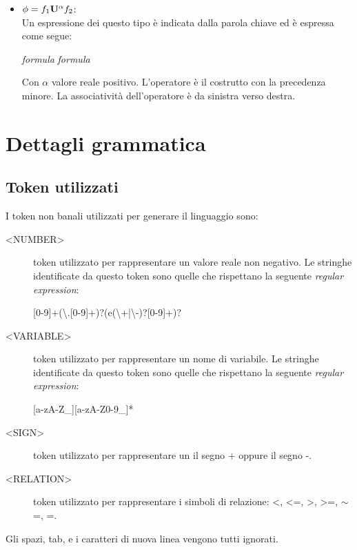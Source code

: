 \documentclass[10pt,a4paper]{article}
\begin{document}
\begin{itemize}
			
			\item $\phi = f_1 \mathbf{U^{\alpha}} f_2$:\\
			Un espressione dei questo tipo è indicata dalla parola chiave \UNTILword{} ed è  espressa come segue:
				\begin{center}
					\emph{formula} \UNTIL{$\alpha$} \emph{formula}
				\end{center}
				Con $\alpha$ valore reale positivo.
				L'operatore \UNTILword{} è il costrutto con la precedenza minore. La associatività dell'operatore è da sinistra verso destra.
	\end{itemize}

	
	
	
	\section{Dettagli grammatica}
	\subsection{Token utilizzati}
	I token non banali utilizzati per generare il linguaggio sono:
	\begin{description}
		\item[<NUMBER>] token utilizzato per rappresentare un valore reale non negativo. Le stringhe identificate da questo token sono quelle che rispettano la seguente \emph{regular expression}:
		\begin{center}
			[0-9]+(\textbackslash.[0-9]+)?(e(\textbackslash+|\textbackslash-)?[0-9]+)?	
		\end{center}
	
		\item[<VARIABLE>] token utilizzato per rappresentare un nome di variabile. Le stringhe identificate da questo token sono quelle che rispettano la seguente \emph{regular expression}:
		\begin{center}
				[a-zA-Z\_][a-zA-Z0-9\_]*	
		\end{center}
	
		\item[<SIGN>] token utilizzato per rappresentare un il segno + oppure il segno -.
		\item[<RELATION>]  token utilizzato per rappresentare i simboli di relazione: <, <=, >, >=, $\sim$=, =.
	\end{description}
	Gli spazi, tab, e i caratteri di nuova linea vengono tutti ignorati.
	
\end{document}
